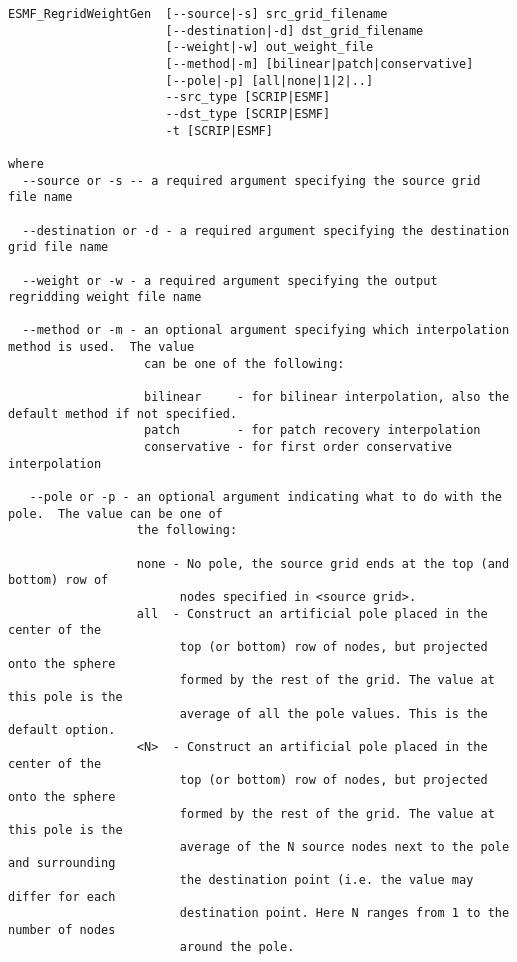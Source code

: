 \begin{verbatim}
ESMF_RegridWeightGen  [--source|-s] src_grid_filename 
                      [--destination|-d] dst_grid_filename 
                      [--weight|-w] out_weight_file 
                      [--method|-m] [bilinear|patch|conservative] 
                      [--pole|-p] [all|none|1|2|..] 
                      --src_type [SCRIP|ESMF] 
                      --dst_type [SCRIP|ESMF]
                      -t [SCRIP|ESMF]

where
  --source or -s -- a required argument specifying the source grid file name

  --destination or -d - a required argument specifying the destination grid file name

  --weight or -w - a required argument specifying the output regridding weight file name

  --method or -m - an optional argument specifying which interpolation method is used.  The value
                   can be one of the following:

                   bilinear     - for bilinear interpolation, also the default method if not specified.
                   patch        - for patch recovery interpolation
                   conservative - for first order conservative interpolation

   --pole or -p - an optional argument indicating what to do with the pole.  The value can be one of
                  the following:

                  none - No pole, the source grid ends at the top (and bottom) row of 
                        nodes specified in <source grid>.
                  all  - Construct an artificial pole placed in the center of the 
                        top (or bottom) row of nodes, but projected onto the sphere 
                        formed by the rest of the grid. The value at this pole is the 
                        average of all the pole values. This is the default option.
                  <N>  - Construct an artificial pole placed in the center of the 
                        top (or bottom) row of nodes, but projected onto the sphere 
                        formed by the rest of the grid. The value at this pole is the 
                        average of the N source nodes next to the pole and surrounding
                        the destination point (i.e. the value may differ for each
                        destination point. Here N ranges from 1 to the number of nodes 
                        around the pole. 


\end{verbatim}

